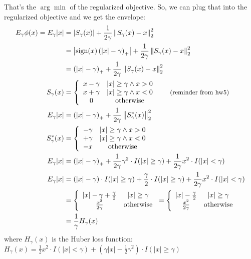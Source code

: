 \documentclass{article}
\begin{document}
That's the $\arg\min$ of the regularized objective. So, we can plug that into the regularized objective and we get
the envelope:
\begin{align*}
E_\gamma \phi(x)=E_\gamma |x|&=\left|S_\gamma(x)\right|+\frac{1}{2\gamma}\left\lVert S_\gamma(x) - x \right\rVert_2^2\\
&=\left|\textrm{sign}(x)\left(|x|-\gamma\right)_+\right|+\frac{1}{2\gamma}\left\lVert S_\gamma(x) - x \right\rVert_2^2\\
&=\left(|x|-\gamma\right)_+ + \frac{1}{2\gamma}\left\lVert S_\gamma(x) - x \right\rVert_2^2\\
S_\gamma(x)&=\left\{\begin{array}{cc}
x-\gamma & |x| \geq \gamma \wedge x > 0\\
x + \gamma & |x| \geq \gamma \wedge x < 0\\
0 & \textrm{otherwise}
\end{array}\right.~~~~~{\small\textrm{(reminder from hw5)}}\\
E_\gamma |x|&=\left(|x|-\gamma\right)_+ + \frac{1}{2\gamma}\left\lVert S_\gamma^*(x) \right\rVert_2^2\\
S_\gamma^*(x)&=\left\{\begin{array}{cc}
-\gamma & |x| \geq \gamma \wedge x > 0\\
+ \gamma & |x| \geq \gamma \wedge x < 0\\
-x & \textrm{otherwise}
\end{array}\right.\\
E_\gamma |x|&=\left(|x|-\gamma\right)_+ + \frac{1}{2\gamma} \gamma^2 \cdot I(|x|\geq\gamma) + \frac{1}{2\gamma} x^2 \cdot I(|x|<\gamma)\\
E_\gamma |x|&=\left(|x|-\gamma\right)\cdot I(|x|\geq\gamma) + \frac{\gamma}{2} \cdot I(|x|\geq\gamma) + \frac{1}{2\gamma} x^2 \cdot I(|x|<\gamma)\\
&=\left\{\begin{array}{cc}
|x|-\gamma+\frac{\gamma}{2} & |x| \geq \gamma\\
\frac{x^2}{2\gamma} & \textrm{otherwise}
\end{array}\right.=\left\{\begin{array}{cc}
|x|-\frac{\gamma}{2} & |x| \geq \gamma\\
\frac{x^2}{2\gamma} & \textrm{otherwise}
\end{array}\right.\\
&=\frac{1}{\gamma} H_\gamma(x)
\end{align*}
where $H_\gamma(x)$ is the Huber loss function: $H_\gamma(x) = \frac{1}{2}x^2 \cdot I(|x|<\gamma) + \left(\gamma|x|-\frac{1}{2}\gamma^2\right)\cdot I(|x|\geq \gamma)$
\end{document}
